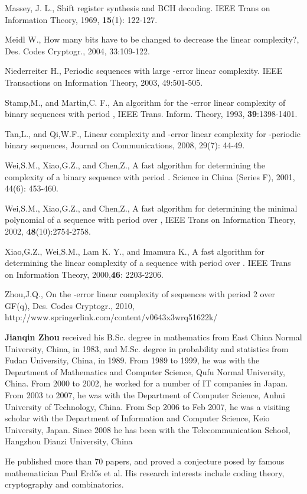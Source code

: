 \documentclass[10pt,conference,twocolumn]{IEEEtran}
\begin{document}
\begin{thebibliography}{3}
Massey, J. L., Shift register synthesis and BCH decoding. IEEE Trans
on Information Theory, 1969, {\bf15}(1): 122-127.



Meidl W., How many bits have to be changed to decrease the linear
complexity?, Des. Codes Cryptogr., 2004, 33:109-122.

Niederreiter H., Periodic sequences with large -error linear
complexity. IEEE Transactions on Information Theory, 2003,
49:501-505.


Stamp,M., and  Martin,C. F., An algorithm for the -error linear
complexity of binary sequences with period , IEEE Trans.
Inform. Theory, 1993, {\bf39}:1398-1401.

Tan,L., and Qi,W.F., Linear complexity and -error linear
complexity for -periodic binary sequences, Journal on
Communications, 2008, 29(7): 44-49.

Wei,S.M., Xiao,G.Z., and Chen,Z., A fast algorithm for determining
the complexity of a binary sequence with period . Science in
China (Series F), 2001, 44(6): 453-460.

Wei,S.M., Xiao,G.Z., and Chen,Z., A fast algorithm for determining
the minimal polynomial of a sequence with period  over
, IEEE Trans on Information Theory, 2002,
{\bf48}(10):2754-2758.


Xiao,G.Z., Wei,S.M., Lam K. Y., and Imamura K., A fast algorithm for
determining the linear complexity of a sequence with period 
over . IEEE Trans on Information Theory, 2000,{\bf 46}:
2203-2206.

 Zhou,J.Q.,  On the -error linear complexity of sequences with period 2 over GF(q),
 Des. Codes Cryptogr., 2010, http://www.springerlink.com/content/v0643x3wrq51622k/


\end{thebibliography}

{\bf Jianqin Zhou} received his B.Sc. degree in mathematics from
East China Normal University, China, in 1983, and M.Sc. degree in
probability and statistics from Fudan University, China, in 1989.
From 1989 to 1999, he was with the Department of Mathematics and
Computer Science, Qufu Normal University, China. From 2000 to 2002,
he worked for a number of IT companies in Japan. From 2003 to 2007,
he was with the Department of Computer Science, Anhui University of
Technology, China.
 From Sep 2006  to
Feb 2007, he was a visiting scholar with the Department of
Information and Computer Science, Keio University, Japan. Since 2008
he has been with the Telecommunication School, Hangzhou Dianzi
University, China


He  published more than 70 papers, and  proved a conjecture posed by
famous mathematician Paul Erd\H{o}s et al. His research interests
include coding theory, cryptography and combinatorics.
\end{document}

